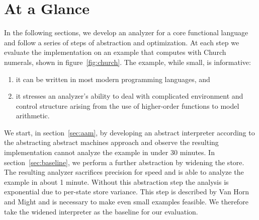 \documentclass[preprint,onecolumn,9pt]{sigplanconf} %
\begin{document}





\section{At a Glance}

In the following sections, we develop an analyzer for a core
functional language and follow a series of steps of abstraction and
optimization.  At each step we evaluate the implementation on an
example that computes with Church numerals, shown in
figure~\ref{fig:church}.
The example, while small, is informative:
\begin{enumerate}
\item it can be written in most modern programming languages, and
%
\item it stresses an analyzer's ability to deal with complicated
environment and control structure arising from the use of higher-order
functions to model arithmetic.
\end{enumerate}

We start, in section~\ref{sec:aam}, by developing an abstract
interpreter according to the abstracting abstract machines approach
and observe the resulting implementation cannot analyze the example in
under 30 minutes.  In section~\ref{sec:baseline}, we perform a further
abstraction by widening the store.  The resulting analyzer sacrifices
precision for speed and is able to analyze the example in about 1
minute.  Without this abstraction step the analysis is exponential due
to per-state store variance.  This step is described by Van Horn and
Might and is necessary to make even small examples feasible.  We
therefore take the widened interpreter as the baseline for our
evaluation.
\end{document}
